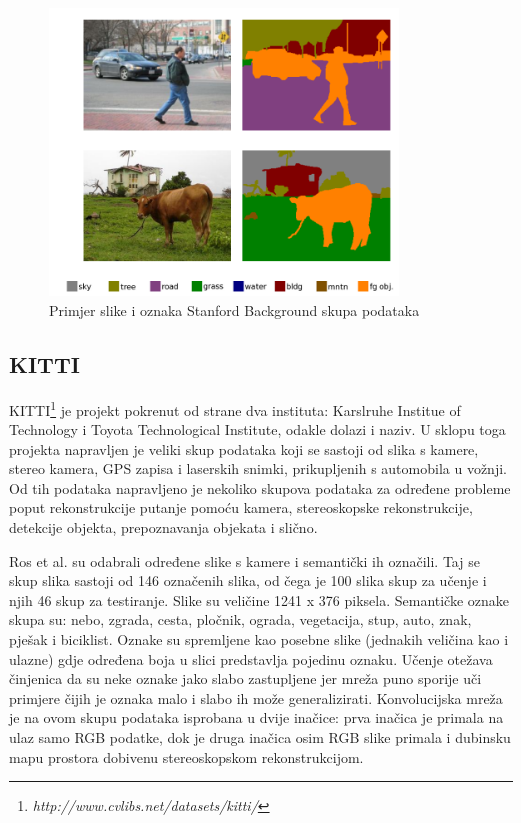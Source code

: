 \documentclass[times, utf8, diplomski, numeric]{fer}
\begin{document}
\begin{figure}[htb]
\centering
\includegraphics[width=350px]{imgs/dag-example.png}
\caption{Primjer slike i oznaka Stanford Background skupa podataka}
\label{fig:stanford_dataset}
\end{figure}

\subsection{KITTI}
KITTI\footnote{\emph{http://www.cvlibs.net/datasets/kitti/}} je projekt pokrenut od strane dva instituta: Karslruhe Institue of Technology i Toyota Technological Institute, odakle dolazi i naziv. U sklopu toga projekta napravljen je veliki skup podataka koji se sastoji od slika s kamere, stereo kamera, GPS zapisa i laserskih snimki, prikupljenih s automobila u vožnji.
Od tih podataka napravljeno je nekoliko skupova podataka za određene probleme poput rekonstrukcije putanje pomoću kamera, stereoskopske rekonstrukcije, detekcije objekta, prepoznavanja objekata i slično.

Ros et al.\cite{ros:2015} su odabrali određene slike s kamere i semantički ih označili. Taj se skup slika sastoji od 146 označenih slika, od čega je 100 slika skup za učenje i njih 46 skup za testiranje. Slike su veličine 1241 x 376 piksela.
Semantičke oznake skupa su: nebo, zgrada, cesta, pločnik, ograda, vegetacija, stup, auto, znak, pješak i biciklist. Oznake su spremljene kao posebne slike (jednakih veličina kao i ulazne) gdje određena boja u slici predstavlja pojedinu oznaku.
Učenje otežava činjenica da su neke oznake jako slabo zastupljene jer mreža puno sporije uči primjere čijih je oznaka malo i slabo ih može generalizirati.
Konvolucijska mreža je na ovom skupu podataka isprobana u dvije inačice: prva inačica je primala na ulaz samo RGB podatke, dok je druga inačica osim RGB slike primala i dubinsku mapu prostora dobivenu stereoskopskom rekonstrukcijom.
\end{document}
